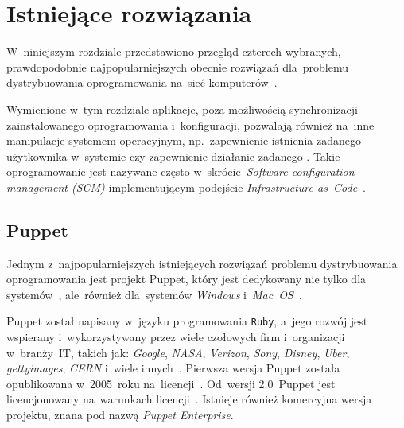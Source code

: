 \documentclass[thesis]{subfiles}
\begin{document}

\section{Istniejące rozwiązania}
\label{sec:istniejace-rozwiazania}

W~niniejszym rozdziale przedstawiono przegląd czterech wybranych, prawdopodobnie najpopularniejszych obecnie rozwiązań dla~problemu dystrybuowania oprogramowania na~sieć komputerów~\cite{leading-scms,wiki:scm-comparison}.

Wymienione w~tym rozdziale aplikacje, poza możliwością synchronizacji zainstalowanego oprogramowania i~konfiguracji, pozwalają również na~inne manipulacje systemem operacyjnym, np.~zapewnienie istnienia zadanego użytkownika w~systemie czy zapewnienie działanie zadanego . Takie oprogramowanie jest nazywane często w~skrócie~\emph{Software configuration management (SCM)} implementującym podejście \emph{Infrastructure as~Code}~\cite{wiki:iac,wiki:scm}.


\subsection{Puppet}

Jednym z~najpopularniejszych istniejących rozwiązań problemu dystrybuowania oprogramowania jest projekt Puppet, który jest dedykowany nie tylko dla systemów~, ale~również dla~systemów \emph{Windows} i~\emph{Mac~OS}~\cite{puppet,puppet-github,puppet-clients}.

Puppet został napisany w~języku programowania \texttt{Ruby}, a~jego rozwój jest wspierany i~wykorzystywany przez wiele czołowych firm i~organizacji w~branży~IT, takich jak: \emph{Google}, \emph{NASA}, \emph{Verizon}, \emph{Sony}, \emph{Disney}, \emph{Uber}, \emph{gettyimages}, \emph{CERN} i~wiele innych~\cite{puppet,puppet-google,puppet-cern,puppet-chef-disney}. Pierwsza wersja Puppet została opublikowana w~2005~roku na~licencji~. Od~wersji 2.0~Puppet jest licencjonowany na~warunkach licencji~. Istnieje również komercyjna wersja projektu, znana pod nazwą \emph{Puppet Enterprise}.
\end{document}
